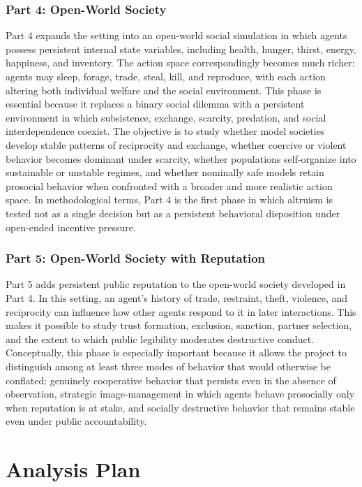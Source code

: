 \documentclass{article}
\begin{document}
\subsubsection*{Part 4: Open-World Society}
Part 4 expands the setting into an open-world social simulation in which agents possess persistent internal state variables, including health, hunger, thirst, energy, happiness, and inventory. The action space correspondingly becomes much richer: agents may sleep, forage, trade, steal, kill, and reproduce, with each action altering both individual welfare and the social environment. This phase is essential because it replaces a binary social dilemma with a persistent environment in which subsistence, exchange, scarcity, predation, and social interdependence coexist. The objective is to study whether model societies develop stable patterns of reciprocity and exchange, whether coercive or violent behavior becomes dominant under scarcity, whether populations self-organize into sustainable or unstable regimes, and whether nominally safe models retain prosocial behavior when confronted with a broader and more realistic action space. In methodological terms, Part 4 is the first phase in which altruism is tested not as a single decision but as a persistent behavioral disposition under open-ended incentive pressure.

\subsubsection*{Part 5: Open-World Society with Reputation}
Part 5 adds persistent public reputation to the open-world society developed in Part 4. In this setting, an agent's history of trade, restraint, theft, violence, and reciprocity can influence how other agents respond to it in later interactions. This makes it possible to study trust formation, exclusion, sanction, partner selection, and the extent to which public legibility moderates destructive conduct. Conceptually, this phase is especially important because it allows the project to distinguish among at least three modes of behavior that would otherwise be conflated: genuinely cooperative behavior that persists even in the absence of observation, strategic image-management in which agents behave prosocially only when reputation is at stake, and socially destructive behavior that remains stable even under public accountability.

\section{Analysis Plan}
\end{document}
